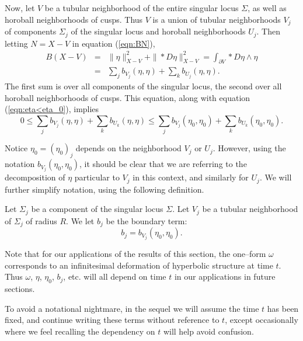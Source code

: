 Now, let $V$ be a tubular neighborhood of the entire singular locus
$\Sigma$, as well as horoball neighborhoods of cusps.  Thus $V$ is a
union of tubular neighborhoods $V_j$ of components $\Sigma_j$ of the
singular locus and horoball neighborhoods $U_j$.  Then letting $N=X-V$
in equation (\ref{eqn:BN}),
\begin{eqnarray}
B(X-V)  & = &\| \eta \|^2_{X-V} + \|*D\eta\|^2_{X-V} =
 \int_{\partial V} *D\eta \wedge \eta \\
 & = &
 \sum_j b_{V_j} (\eta, \eta) + \sum_k b_{U_j}(\eta,\eta).
\label{eqn:sumbj=eta}
\end{eqnarray}
The first sum is over all components of the singular locus, the second
over all horoball neighborhoods of cusps.  This equation, along with
equation (\ref{eqn:eta<eta_0}), implies
\begin{equation}
  0 \leq  \sum_j b_{V_j} (\eta, \eta)+ \sum_k
  b_{U_k}(\eta,\eta)  \leq \sum_j b_{V_j} (\eta_0,
  \eta_0) + \sum_k b_{U_k} (\eta_0, \eta_0).
\label{eqn:sum>0}
\end{equation}

Notice $\eta_0 = (\eta_0)_j$ depends on the neighborhood $V_j$ or
$U_j$.  However, using the notation $b_{V_j}(\eta_0, \eta_0)$, it
should be clear that we are referring to the decomposition of $\eta$
particular to $V_j$ in this context, and similarly for $U_j$.  We will
further simplify notation, using the following definition.

\begin{define}
  Let $\Sigma_j$ be a component of the singular locus $\Sigma$.  Let
  $V_j$ be a tubular neighborhood of $\Sigma_j$ of radius $R$.  We let
  $b_j$ be the boundary term:
  $$b_j = b_{V_j}(\eta_0, \eta_0).$$
  \label{def:bj}
\end{define}

\begin{remark}
Note that for our applications of the results of this section, the
one--form $\omega$ corresponds to an infinitesimal deformation of
hyperbolic structure at time $t$.  Thus $\omega$, $\eta$, $\eta_0$,
$b_j$, etc. will all depend on time $t$ in our applications in future
sections.

To avoid a notational nightmare, in the sequel we will assume the time
$t$ has been fixed, and continue writing these terms without reference
to $t$, except occasionally where we feel recalling the dependency on
$t$ will help avoid confusion.
\end{remark}

